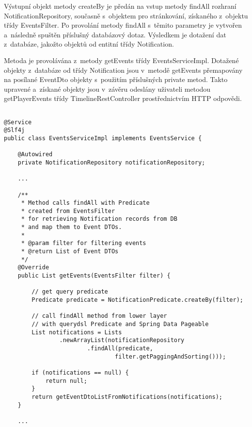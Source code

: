 \documentclass[12pt]{article}
\begin{document}
Výstupní objekt metody createBy je předán na vstup metody findAll rozhraní NotificationRepository,
současně s~objektem pro stránkování, získaného z~objektu třídy EventsFilter. 
Po provolání metody findAll s~těmito parametry je vytvořen a~následně spuštěn příslušný databázový dotaz.
Výsledkem je dotažení dat z~databáze, jakožto objektů od entitní třídy Notification.

Metoda je provolávána z~metody getEvents třídy EventsServiceImpl.
Dotažené objekty z~databáze od třídy Notification jsou v~metodě getEvents
přemapovány na posílané EventDto objekty s~použitím příslušných private metod.
Takto upravené a~získané objekty jsou v~závěru odeslány uživateli metodou getPlayerEvents
třídy TimelineRestController prostřednictvím HTTP odpovědi.


\clearpage

\begin{lstlisting}

@Service
@Slf4j
public class EventsServiceImpl implements EventsService {

    @Autowired
    private NotificationRepository notificationRepository;
    
    ...
    
    /**
     * Method calls findAll with Predicate
     * created from EventsFilter
     * for retrieving Notification records from DB
     * and map them to Event DTOs.
     *
     * @param filter for filtering events
     * @return List of Event DTOs
     */
    @Override
    public List getEvents(EventsFilter filter) {

        // get query predicate
        Predicate predicate = NotificationPredicate.createBy(filter);

        // call findAll method from lower layer
        // with querydsl Predicate and Spring Data Pageable
        List notifications = Lists
                .newArrayList(notificationRepository
                        .findAll(predicate,
                                filter.getPaggingAndSorting()));

        if (notifications == null) {
            return null;
        }
        return getEventDtoListFromNotifications(notifications);
    }
    
    ...

\end{lstlisting}


\clearpage
\end{document}
